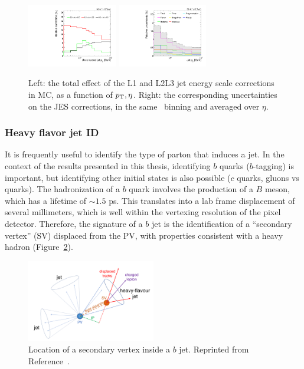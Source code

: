 \begin{figure}[]
\begin{center}
	\includegraphics[width=0.35\textwidth]{figures/cms/jec_jotjotRawPt.pdf}
	\includegraphics[width=0.35\textwidth]{figures/cms/var_jotjotPt.pdf}
	\caption{Left: the total effect of the L1 and L2L3 jet energy scale corrections in MC, as a function of $p_\mathrm{T},\eta$.
			 Right: the corresponding uncertainties on the JES corrections, in the same \pt~binning and averaged over $\eta$.}
	\label{fig:cms:jec}
\end{center}
\end{figure}

\subsubsection{Heavy flavor jet ID}

It is frequently useful to identify the type of parton that induces a jet.
In the context of the results presented in this thesis, identifying $b$ quarks ($b$-tagging) is important, but identifying other initial states is also possible ($c$ quarks, gluons vs quarks). 
The hadronization of a $b$ quark involves the production of a $B$ meson, which has a lifetime of $\sim 1.5$ ps. 
This translates into a lab frame displacement of several millimeters, which is well within the vertexing resolution of the pixel detector.
Therefore, the signature of a $b$ jet is the identification of a ``secondary vertex'' (SV) displaced from the PV, with properties consistent with a heavy hadron (Figure~\ref{fig:cms:bjet}).

\begin{figure}[]
\begin{center}
	\includegraphics[width=0.5\textwidth]{figures/cms/bjet.png}
	\caption{Location of a secondary vertex inside a $b$ jet.
			 Reprinted from Reference~\cite{csvv2}.}
	\label{fig:cms:bjet}
\end{center}
\end{figure}

